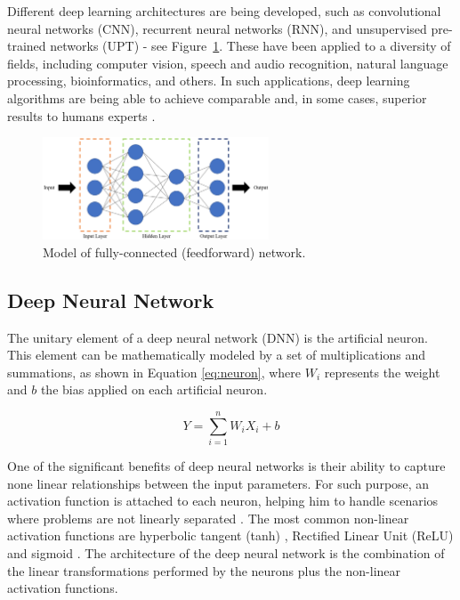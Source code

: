 Different deep learning architectures are being developed, such as convolutional neural networks (CNN), recurrent neural networks (RNN), and unsupervised pre-trained networks (UPT) - see Figure~\ref{fig:DNNarch}. These have been applied to a diversity of fields, including computer vision, speech and audio recognition, natural language processing, bioinformatics, and others. In such applications, deep learning algorithms are being able to achieve comparable and, in some cases, superior results to humans experts \cite{noauthor_googles_nodate}.

\begin{figure}[!htb]
  \centering
  \includegraphics[width=0.6\textwidth]{Figures/DL/DNNarch.png}
  \caption[]{Model of fully-connected (feedforward) network.}
  \label{fig:DNNarch}
\end{figure}


\subsection{Deep Neural Network}
The unitary element of a deep neural network (DNN) is the artificial neuron. This element can be mathematically modeled by a set of multiplications and summations, as shown in Equation \ref{eq:neuron}, where $W_i$ represents the weight and $b$ the bias applied on each artificial neuron.

\begin{equation}
\label{eq:neuron}
    Y = \sum_{i=1}^{n} W_iX_i+b
\end{equation}

One of the significant benefits of deep neural networks is their ability to capture none linear relationships between the input parameters. For such purpose, an activation function is attached to each neuron, helping him to handle scenarios where problems are not linearly separated \cite{dong_dnnmark:_2017}. The most common non-linear activation functions are  hyperbolic tangent (tanh) \cite{orr_neural_1998}, Rectified Linear Unit (ReLU) \cite{orr_neural_1998} and sigmoid \cite{orr_neural_1998}. The architecture of the deep neural network is the combination of the linear transformations performed by the neurons plus the non-linear activation functions.

